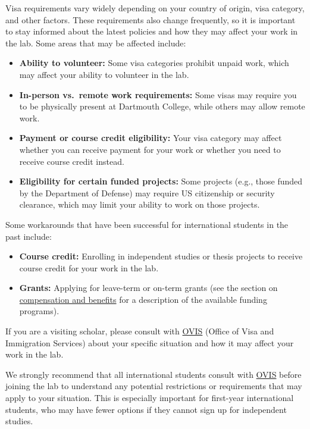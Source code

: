 \documentclass{tufte-book} %
\newcommand{\ourschool}{Dartmouth College}
\begin{document}

\noindent Visa requirements vary widely depending on your country of origin,
visa category, and other factors.  These requirements also change
frequently, so it is important to stay informed about the latest policies
and how they may affect your work in the lab.  Some areas that may be
affected include:

\begin{itemize}
\item \textbf{Ability to volunteer:} Some visa categories prohibit unpaid
  work, which may affect your ability to volunteer in the lab.
\item \textbf{In-person vs.\ remote work requirements:} Some visas may
  require you to be physically present at \ourschool, while others may
  allow remote work.
\item \textbf{Payment or course credit eligibility:} Your visa category may
  affect whether you can receive payment for your work or whether you need
  to receive course credit instead.
\item \textbf{Eligibility for certain funded projects:} Some projects (e.g.,
  those funded by the Department of Defense) may require US citizenship or
  security clearance, which may limit your ability to work on those
  projects.
\end{itemize}

\noindent Some workarounds that have been successful for international
students in the past include:

\begin{itemize}
\item \textbf{Course credit:} Enrolling in independent studies or thesis
  projects to receive course credit for your work in the lab.
\item \textbf{Grants:} Applying for leave-term or on-term grants (see
  the section on \hyperref[sec:compensation]{compensation and
    benefits} for a description of the available funding programs).
\end{itemize}

\noindent If you are a visiting scholar, please consult with
\href{https://ovis-intl.dartmouth.edu/}{OVIS} (Office of Visa and
Immigration Services) about your specific situation and how it may affect
your work in the lab.

\noindent We strongly recommend that all international students consult with
\href{https://ovis-intl.dartmouth.edu/}{OVIS} before joining the lab to
understand any potential restrictions or requirements that may apply to
your situation.  This is especially important for first-year international
students, who may have fewer options if they cannot sign up for independent
studies.
\end{document}
